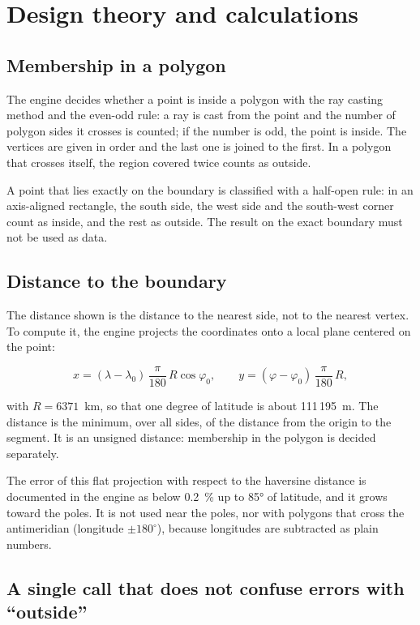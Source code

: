 \section{Design theory and calculations}

\subsection{Membership in a polygon}

The engine decides whether a point is inside a polygon with the ray casting method and the even-odd rule: a
ray is cast from the point and the number of polygon sides it crosses is counted; if the number is odd, the
point is inside. The vertices are given in order and the last one is joined to the first. In a polygon that
crosses itself, the region covered twice counts as outside.

A point that lies exactly on the boundary is classified with a half-open rule: in an axis-aligned rectangle,
the south side, the west side and the south-west corner count as inside, and the rest as outside. The result
on the exact boundary must not be used as data.

\subsection{Distance to the boundary}

The distance shown is the distance to the nearest side, not to the nearest vertex. To compute it, the engine
projects the coordinates onto a local plane centered on the point:

\begin{equation}
x = (\lambda - \lambda_0)\,\frac{\pi}{180}\,R\cos\varphi_0, \qquad
y = (\varphi - \varphi_0)\,\frac{\pi}{180}\,R,
\end{equation}

with $R = 6371$~km, so that one degree of latitude is about 111\,195~m. The distance is the minimum, over
all sides, of the distance from the origin to the segment. It is an unsigned distance: membership in the
polygon is decided separately.

The error of this flat projection with respect to the haversine distance is documented in the engine as
below 0.2~\% up to 85° of latitude, and it grows toward the poles. It is not used near the poles, nor with
polygons that cross the antimeridian (longitude $\pm180^\circ$), because longitudes are subtracted as plain
numbers.

\subsection{A single call that does not confuse errors with ``outside''}

